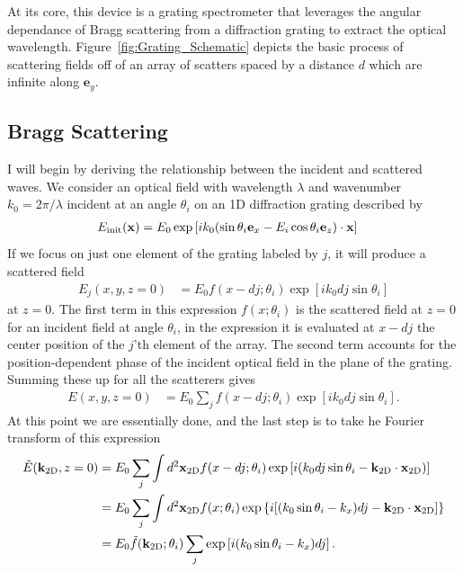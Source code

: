 \documentclass[letterpaper,preprint,aps,pra,superscriptaddress]{revtex4-1}
\def\ex{\mathbf{e}_x}
\def\ey{\mathbf{e}_y}
\def\ez{\mathbf{e}_z}
\begin{document}
At its core, this device is a grating spectrometer that leverages the angular dependance of Bragg scattering from a diffraction grating to extract the optical wavelength.  Figure~\ref{fig:Grating_Schematic} depicts the basic process of scattering fields off of an array of scatters spaced by a distance $d$ which are infinite along $\ey$.  

\subsection{Bragg Scattering}

I will begin by deriving the relationship between the incident and scattered waves.  We consider an optical field with wavelength $\lambda$ and wavenumber $k_0 = 2\pi/\lambda$ incident at an angle $\theta_i$ on an 1D diffraction grating described by
\begin{align}
E_{\rm init}({\bf x}) &= E_0 \exp\left[i k_0 (\sin\theta_i \ex - E_i \cos\theta_i\ez)\cdot{\bf x} \right]
\end{align}
If we focus on just one element of the grating labeled by $j$, it will produce a scattered field 
\begin{align}
E_j(x,y,z=0) &= E_0 f(x-dj;\theta_i) \exp\left[i k_0 d j \sin\theta_i \right]
\end{align}
at $z=0$.  The first term in this expression $f(x;\theta_i)$ is the scattered field at $z=0$ for an incident field at angle $\theta_i$, in the expression it is evaluated at $x-dj$ the center position of the $j$'th element of the array.  The second term accounts for the position-dependent phase of the incident optical field in the plane of the grating.  Summing these up for all the scatterers gives
\begin{align}
E(x,y,z=0) &= E_0 \sum_j f(x-dj;\theta_i) \exp\left[i k_0 d j \sin\theta_i \right].
\end{align}
At this point we are essentially done, and the last step is to take he Fourier transform of this expression
\begin{align}
\tilde E({\bf k}_{\rm 2D},z=0) &= E_0 \sum_j \int d^2 {\bf x}_{\rm 2D} f(x-dj;\theta_i) \exp\left[i (k_0 d j \sin\theta_i - {\bf k}_{\rm 2D}\cdot{\bf x}_{\rm 2D}) \right] \\
&= E_0 \sum_j \int d^2 {\bf x}_{\rm 2D} f(x;\theta_i) \exp\left\{i [(k_0 \sin\theta_i - k_x) d j - {\bf k}_{\rm 2D}\cdot{\bf x}_{\rm 2D}] \right\}\\
&= E_0 \tilde f({\bf k}_{\rm 2D};\theta_i) \sum_j \exp\left[i (k_0 \sin\theta_i - k_x) d j \right].
\end{align}
\end{document}

